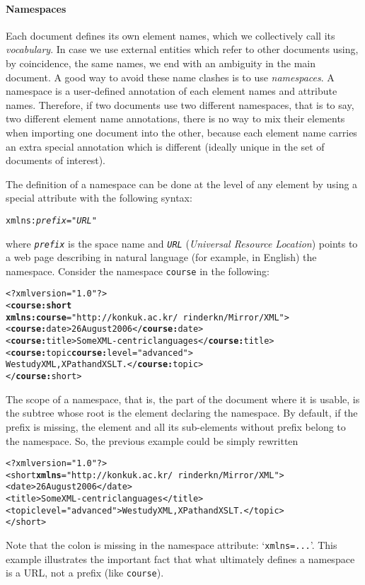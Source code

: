 \paragraph{Namespaces}

Each \XML document defines its own element names, which we
collectively call its \emph{vocabulary}. In case we use external
entities which refer to other \XML documents using, by coincidence,
the same names, we end with an ambiguity in the main document. A good
way to avoid these name clashes is to use \emph{namespaces}. A
namespace is a user\hyp{}defined annotation of each element names and
attribute names. Therefore, if two \XML documents use two different
namespaces, that is to say, two different element name annotations,
there is no way to mix their elements when importing one document into
the other, because each element name carries an extra special
annotation which is different (ideally unique in the set of documents
of interest).

The definition of a namespace can be done at the level of any element
by using a special attribute with the following syntax:
\begin{alltt}
xmlns:\textit{prefix} = "\textit{URL}"
\end{alltt}
where \texttt{\emph{prefix}} is the space name and \texttt{\emph{URL}}
(\emph{Universal Resource Location}) points to a web page describing
in natural language (for example, in English) the namespace. Consider
the namespace \texttt{course} in the following:
\begin{alltt}
<?xml version="1.0"?>
<\textbf{course:short} 
  \textbf{xmlns:course}="http://konkuk.ac.kr/~rinderkn/Mirror/XML">
 <\textbf{course:}date>26 August 2006</\textbf{course:}date>
 <\textbf{course:}title>Some XML-centric languages</\textbf{course:}title>
 <\textbf{course:}topic \textbf{course:}level="advanced">
   We study XML, XPath and XSLT.</\textbf{course:}topic>
</\textbf{course:}short>
\end{alltt}
The scope of a namespace, that is, the part of the document where it
is usable, is the subtree whose root is the element declaring the
namespace. By default, if the prefix is missing, the element and all
its sub\hyp{}elements without prefix belong to the namespace. So, the
previous example could be simply rewritten
\begin{alltt}
<?xml version="1.0"?>
<short \textbf{xmlns}="http://konkuk.ac.kr/~rinderkn/Mirror/XML">
 <date>26 August 2006</date>
 <title>Some XML-centric languages</title>
 <topic level="advanced">We study XML, XPath and XSLT.</topic>
</short>
\end{alltt}
Note that the colon is missing in the namespace attribute:
`\texttt{xmlns=...}'. This example illustrates the important fact that
what ultimately defines a namespace is a URL, not a prefix (like
\texttt{course}).

